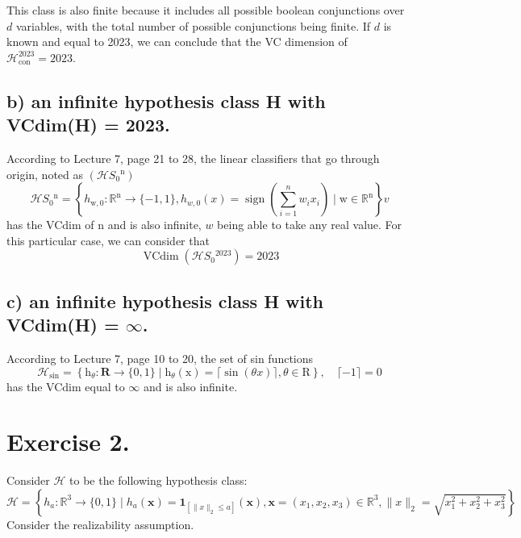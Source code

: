 \documentclass[11pt, a4paper]{article}
\begin{document}
\begin{large}
This class is also finite because it includes all possible boolean conjunctions over $d$ variables, with the total number of possible conjunctions being finite. If $d$ is known and equal to 2023,  we can conclude that the VC dimension of $\mathcal{H}_{\text {con }}^{2023}=2023$.




\subsection{b) an infinite hypothesis class H with VCdim(H) = 2023.}
According to Lecture 7, page 21 to 28, the  linear classifiers that go through origin, noted as  $
\left(\mathcal{H} S_0{ }^{\mathrm{n}}\right)
$
$$
\mathcal{H} S_0{ }^{\mathrm{n}}=\left\{h_{\mathrm{w}, 0}: \mathbb{R}^{\mathrm{n}} \rightarrow\{-1,1\}, h_{w, 0}(x)=\operatorname{sign}\left(\sum_{i=1}^n w_i x_i\right) \mid \mathrm{w} \in \mathbb{R}^{\mathrm{n}}\right\}
v$$has the VCdim of n and is also infinite, $w$ being able to take any real value. For this particular case, we can consider that $$
\operatorname{VCdim}\left(\mathcal{H} S_0{ }^{2023}\right) = 2023
$$


\subsection{c) an infinite hypothesis class H with VCdim(H) = $\infty$.}
According to Lecture 7, page 10 to 20, the set of sin functions
$$
\mathcal{H}_{\mathrm{sin}}=\left\{\mathrm{h}_\theta: \mathbf{R} \rightarrow\{0,1\} \mid \mathrm{h}_\theta(\mathrm{x})=\lceil\sin (\theta x)\rceil, \theta \in \mathrm{R}\right\}, \quad\lceil-1\rceil=0
$$
has the VCdim equal to $\infty$ and is also infinite.



\section{Exercise 2.}
Consider $\mathcal{H}$ to be the following hypothesis class:
$$
\mathcal{H}=\left\{h_a: \mathbb{R}^3 \rightarrow\{0,1\} \mid h_a(\mathbf{x})=\mathbf{1}_{\left[\|x\|_2 \leq a\right]}(\mathbf{x}), \mathbf{x}=\left(x_1, x_2, x_3\right) \in \mathbb{R}^3,\|x\|_2=\sqrt{x_1^2+x_2^2+x_3^2}\right\}
$$
Consider the realizability assumption.

\end{large}
\end{document}
